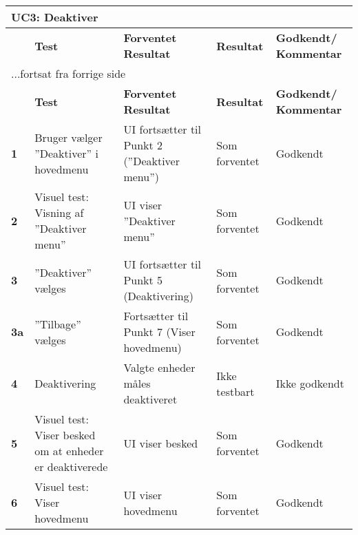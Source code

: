 
\begin{center}
\begin{longtable}{|p{}|p{}|p{}|p{}|p{}|} %
\hline
\multicolumn{5}{|l|}{\textbf{UC3: Deaktiver}} \\ \hline
\multicolumn{1}{|c|}{} &
\textbf{Test} &
\textbf{Forventet \newline Resultat} &
\textbf{Resultat} &
\textbf{Godkendt/ \newline Kommentar} \\ \hline 
\endfirsthead

\multicolumn{5}{l}{...fortsat fra forrige side} \\ \hline 
\multicolumn{1}{|c|}{} &
\textbf{Test} &
\textbf{Forventet \newline Resultat} &
\textbf{Resultat} &
\textbf{Godkendt/ \newline Kommentar} \\ \hline 
\endhead


		
\textbf{1}			&Bruger vælger ''Deaktiver'' i hovedmenu															
					&UI fortsætter til Punkt 2 (''Deaktiver menu'')
					&Som \newline forventet
					&Godkendt \\\hline
					
\textbf{2}			&Visuel test: Visning af ''Deaktiver menu''																
					&UI viser ''Deaktiver menu''
					&Som \newline forventet
					&Godkendt \\\hline

\textbf{3}			&''Deaktiver'' vælges			
					&UI fortsætter til Punkt 5 (Deaktivering)
					&Som \newline forventet
					&Godkendt \\\hline
					
\textbf{3a}			&''Tilbage'' vælges			
					&Fortsætter til Punkt 7 (Viser hovedmenu)
					&Som \newline forventet
					&Godkendt \\\hline

\textbf{4}			&Deaktivering			
					&Valgte enheder måles deaktiveret
					&Ikke \newline testbart 
					&Ikke \newline godkendt  \\\hline
		
\textbf{5}			&Visuel test: Viser besked om at enheder er deaktiverede
					&UI viser besked
					&Som \newline forventet
					&Godkendt \\\hline
					
\textbf{6}			&Visuel test: Viser hovedmenu
					&UI viser hovedmenu
					&Som \newline forventet
					&Godkendt \\\hline
					

	\end{longtable}
	\label{ATUC3} 
\end{center}